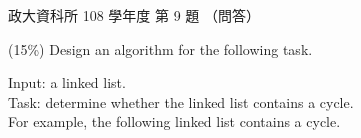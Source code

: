 \begin{pastexam}[label={px:nccu-108-dsa-09}]{政大資科所 108 學年度 第 9 題}
（問答）

(15\%) Design an algorithm for the following task.

\quad Input: a linked list.\\
\quad Task: determine whether the linked list contains a cycle.\\
\quad For example, the following linked list contains a cycle.
\begin{center}
\end{center}
\end{pastexam}

